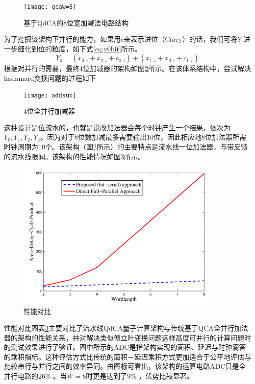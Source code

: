 \documentclass[UTF8, 11pt, a4paper]{ctexart}
\begin{document}
\begin{figure}[H]
\begin{center}
\texttt{[image: qcaw=8]}
\caption{基于QdCA的8位宽加减法电路结构}
\label{gf:qcaw8}
\end{center}
\end{figure}
为了挖掘该架构下并行的能力，如果用c来表示进位（Carry）的话，我们可将$Y$	进一步细化到位的粒度，如下式\ref{eq:y0bit}所示。
\begin{equation}
\label{eq:y0bit}
Y_0=(x_{0,i} + x_{2,i} + c_{0,i}) + (x_{1,i} + x_{3,i} + c_{1,i})
\end{equation}
根据对并行的需要，最终4位加减器的架构如图\ref{gf:addsub}所示。在该体系结构中，尝试解决hadamard变换问题的过程如下
\begin{figure}[H]
\begin{center}
\texttt{[image: addsub]}
\caption{4位全并行加减器}
\label{gf:addsub}
\end{center}
\end{figure}

这种设计是位流水的，也就是说改加法器会每个时钟产生一个结果，依次为$Y_0 , Y_1 ,Y_2 ,Y_3$。因为对于8位数加减最多需要输出10位，因此相应地8位加法器所需时钟周期为10个。该架构（图\ref{gf:addsub}所示）的主要特点是流水线一位加法器，与带反馈的流水线限阀。该架构的性能情况如图\ref{gf:qca_performance}所示。

\begin{figure}[H]
\begin{center}
\includegraphics[width=4in]{qca_performance}
\caption{性能对比}
\label{gf:qca_performance}
\end{center}
\end{figure}

性能对比图表\ref{gf:qca_performance}主要对比了流水线QdCA量子计算架构与传统基于QCA全并行加法器的架构的性能关系，并对解决类似傅立叶变换问题这样高度可并行的计算问题时的测试效果进行了验证。图中所示的ADC是指架构实现的面积、延迟与时钟滴答的乘积指标。这种评估方式比传统的面积－延迟乘积方式更加适合于公平地评估与比较串行与并行之间的效率异同。由图标可看出，该架构的运算电路ADC只是全并行电路的26\% 。当$W=8$时更是达到了9\% ，优势比较显著。
\end{document}
